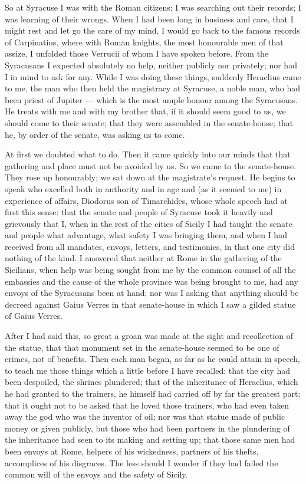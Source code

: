  So at Syracuse I was with the Roman citizens; I was searching out their records; I was learning of their wrongs. When I had been long in business and care, that I might rest and let go the care of my mind, I would go back to the famous records of Carpinatius, where with Roman knights, the most honourable men of that assize, I unfolded those Verrucii of whom I have spoken before. From the Syracusans I expected absolutely no help, neither publicly nor privately; nor had I in mind to ask for any. While I was doing these things, suddenly Heraclius came to me, the man who then held the magistracy at Syracuse, a noble man, who had been priest of Jupiter --- which is the most ample honour among the Syracusans. He treats with me and with my brother that, if it should seem good to us, we should come to their senate; that they were assembled in the senate-house; that he, by order of the senate, was asking us to come.

 At first we doubted what to do. Then it came quickly into our minds that that gathering and place must not be avoided by us. So we came to the senate-house. They rose up honourably; we sat down at the magistrate's request. He begins to speak who excelled both in authority and in age and (as it seemed to me) in experience of affairs, Diodorus son of Timarchides, whose whole speech had at first this sense: that the senate and people of Syracuse took it heavily and grievously that I, when in the rest of the cities of Sicily I had taught the senate and people what advantage, what safety I was bringing them, and when I had received from all mandates, envoys, letters, and testimonies, in that one city did nothing of the kind. I answered that neither at Rome in the gathering of the Sicilians, when help was being sought from me by the common counsel of all the embassies and the cause of the whole province was being brought to me, had any envoys of the Syracusans been at hand; nor was I asking that anything should be decreed against Gaius Verres in that senate-house in which I saw a gilded statue of Gaius Verres.

 After I had said this, so great a groan was made at the sight and recollection of the statue, that that monument set in the senate-house seemed to be one of crimes, not of benefits. Then each man began, as far as he could attain in speech, to teach me those things which a little before I have recalled: that the city had been despoiled, the shrines plundered; that of the inheritance of Heraclius, which he had granted to the trainers, he himself had carried off by far the greatest part; that it ought not to be asked that he loved those trainers, who had even taken away the god who was the inventor of oil; nor was that statue made of public money or given publicly, but those who had been partners in the plundering of the inheritance had seen to its making and setting up; that those same men had been envoys at Rome, helpers of his wickedness, partners of his thefts, accomplices of his disgraces. The less should I wonder if they had failed the common will of the envoys and the safety of Sicily.

